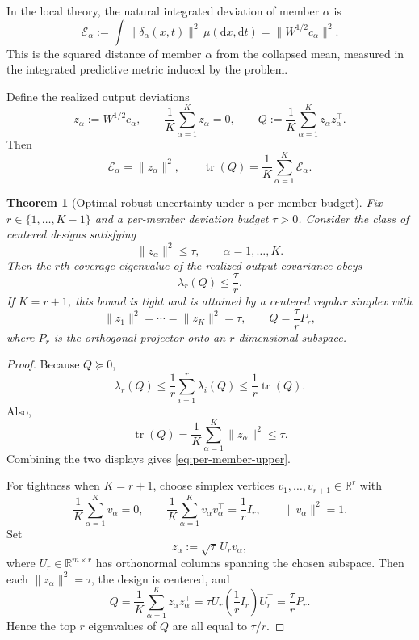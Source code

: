 \documentclass[11pt]{article}
\newcommand{\R}{\mathbb{R}}
\newcommand{\tr}{\operatorname{tr}}
\newtheorem{theorem}{Theorem}
\theoremstyle{remark}
\begin{document}
In the local theory, the natural integrated deviation of member $\alpha$ is
\[
\mathcal E_\alpha := \int \|\delta_\alpha(x,t)\|^2\,\mu(\mathrm dx,\mathrm dt)
=
\|W^{1/2}c_\alpha\|^2.
\]
This is the squared distance of member $\alpha$ from the collapsed mean, measured in the integrated predictive metric induced by the problem.

Define the realized output deviations
\[
z_\alpha := W^{1/2}c_\alpha,
\qquad
\frac1K\sum_{\alpha=1}^K z_\alpha = 0,
\qquad
Q := \frac1K\sum_{\alpha=1}^K z_\alpha z_\alpha^\top.
\]
Then
\[
\mathcal E_\alpha = \|z_\alpha\|^2,
\qquad
\tr(Q)=\frac1K\sum_{\alpha=1}^K \mathcal E_\alpha.
\]

\begin{theorem}[Optimal robust uncertainty under a per-member budget]
\label{thm:per-member-budget}
Fix $r\in\{1,\dots,K-1\}$ and a per-member deviation budget $\tau>0$. Consider the class of centered designs satisfying
\[
\|z_\alpha\|^2 \le \tau,
\qquad
\alpha=1,\dots,K.
\]
Then the $r$th coverage eigenvalue of the realized output covariance obeys
\begin{equation}
\lambda_r(Q)\le \frac{\tau}{r}.
\label{eq:per-member-upper}
\end{equation}
If $K=r+1$, this bound is tight and is attained by a centered regular simplex with
\[
\|z_1\|^2=\cdots=\|z_K\|^2=\tau,
\qquad
Q=\frac{\tau}{r}P_r,
\]
where $P_r$ is the orthogonal projector onto an $r$-dimensional subspace.
\end{theorem}

\begin{proof}
Because $Q\succeq 0$,
\[
\lambda_r(Q)\le \frac{1}{r}\sum_{i=1}^r \lambda_i(Q)\le \frac{1}{r}\tr(Q).
\]
Also,
\[
\tr(Q)=\frac1K\sum_{\alpha=1}^K \|z_\alpha\|^2 \le \tau.
\]
Combining the two displays gives \eqref{eq:per-member-upper}.

For tightness when $K=r+1$, choose simplex vertices $v_1,\dots,v_{r+1}\in\R^r$ with
\[
\frac1K\sum_{\alpha=1}^K v_\alpha = 0,
\qquad
\frac1K\sum_{\alpha=1}^K v_\alpha v_\alpha^\top = \frac1r I_r,
\qquad
\|v_\alpha\|^2=1.
\]
Set
\[
z_\alpha := \sqrt{\tau}\,U_r v_\alpha,
\]
where $U_r\in\R^{m\times r}$ has orthonormal columns spanning the chosen subspace. Then each $\|z_\alpha\|^2=\tau$, the design is centered, and
\[
Q=\frac1K\sum_{\alpha=1}^K z_\alpha z_\alpha^\top
=
\tau U_r\left(\frac1r I_r\right)U_r^\top
=
\frac{\tau}{r}P_r.
\]
Hence the top $r$ eigenvalues of $Q$ are all equal to $\tau/r$.
\end{proof}
\end{document}

